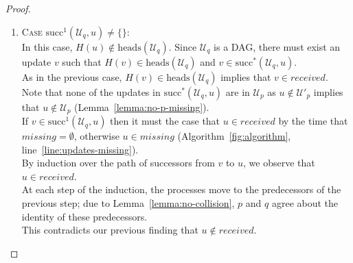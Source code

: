 \documentclass[a4paper,anonymous,USenglish]{lipics-v2019}
\begin{document}
\begin{proof}
\begin{enumerate}
    \item\textsc{Case} $\mathrm{succ}^1(\mathcal{U}_q, u) \ne \{\}$:\\
    In this case, $H(u) \notin \mathrm{heads}(\mathcal{U}_q)$.
    Since $\mathcal{U}_q$ is a DAG, there must exist an update $v$ such that $H(v) \in \mathrm{heads}(\mathcal{U}_q)$ and $v \in \mathrm{succ}^*(\mathcal{U}_q, u)$.\\
    As in the previous case, $H(v) \in \mathrm{heads}(\mathcal{U}_q)$ implies that $v \in \mathit{received}$.\\
    Note that none of the updates in $\mathrm{succ}^*(\mathcal{U}_q, u)$ are in $\mathcal{U}_p$ as $u \notin \mathcal{U}'_p$ implies that  $u \notin \mathcal{U}_p$ (Lemma~\ref{lemma:no-p-missing}).\\
    If $v \in \mathrm{succ}^1(\mathcal{U}_q, u)$ then it must the case that $u \in \mathit{received}$ by the time that $\mathit{missing} = \emptyset$, otherwise $u \in \mathit{missing}$ (Algorithm~\ref{fig:algorithm}, line~\ref{line:updates-missing}).\\
    By induction over the path of successors from $v$ to $u$, we observe that $u \in \mathit{received}$.\\
    At each step of the induction, the processes move to the predecessors of the previous step; due to Lemma~\ref{lemma:no-collision}, $p$ and $q$ agree about the identity of these predecessors.\\
    This contradicts our previous finding that $u \notin \mathit{received}$.
\end{enumerate}
\end{proof}
\end{document}
